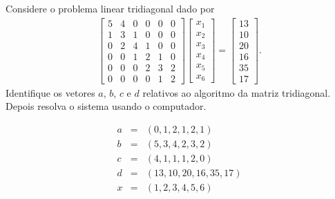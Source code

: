 \begin{exer} Considere o problema linear tridiagonal dado por
\begin{eqnarray} \begin{bmatrix}
   { 5  } & { 4 } & { 0 } & { 0 } & { 0 } & { 0 } \\
   { 1  } & { 3 } & { 1 } & { 0 } & { 0 } & { 0 } \\
   { 0  } & { 2 } & { 4 } & { 1 } & { 0 } & { 0 } \\
   { 0  } & { 0 } & { 1 } & { 2 } & { 1 } & { 0 } \\
   { 0  } & { 0 } & { 0 } & { 2 } & { 3 } & { 2 } \\
   { 0  } & { 0 } & { 0 } & { 0 } & { 1 } & { 2 }
    \end{bmatrix}
\begin{bmatrix}
   {x_1 }  \\
   {x_2 }  \\
   {x_3 }  \\
   {x_4 }  \\
   {x_5 }  \\
   {x_6}
\end{bmatrix}
=
\begin{bmatrix}
   {13}  \\
   {10 }  \\
   {20}  \\
   {16}\\
   {35}\\
   {17}
\end{bmatrix}
.
\end{eqnarray}
 Identifique os vetores $a$, $b$, $c$ e $d$  relativos ao algoritmo da matriz tridiagonal. Depois resolva o sistema usando o computador.
\end{exer}

\begin{resp}
 \begin{eqnarray*}
  a &=& (0, 1, 2, 1, 2, 1)\\
  b &=& (5, 3, 4, 2, 3, 2)\\
  c &=& (4, 1, 1, 1, 2, 0)\\
  d &=& (13, 10, 20, 16, 35, 17)\\
  x &=& (1, 2, 3, 4, 5, 6)
 \end{eqnarray*}
\end{resp}

